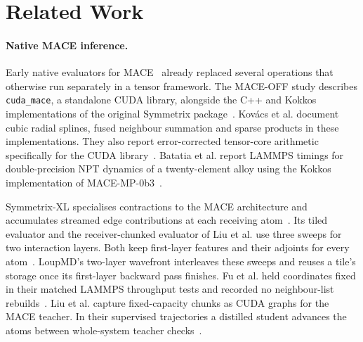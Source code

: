 \section{Related Work}
\label{sec:related}

\paragraph{Native MACE inference.}
Early native evaluators for MACE~\cite{batatia2022mace} already replaced several operations that otherwise run separately in a tensor framework. The MACE-OFF study describes \texttt{cuda\_mace}, a standalone CUDA library, alongside the C++ and Kokkos implementations of the original Symmetrix package~\cite{kovacs2025maceoff,witt2026symmetrix}. Kov\'acs et al. document cubic radial splines, fused neighbour summation and sparse products in these implementations. They also report error-corrected tensor-core arithmetic specifically for the CUDA library~\cite[\S III.5]{kovacs2025maceoff}. Batatia et al. report LAMMPS timings for double-precision NPT dynamics of a twenty-element alloy using the Kokkos implementation of MACE-MP-0b3~\cite[Appendix~A.32, Fig.~S50]{batatia2025materials}.

Symmetrix-XL specialises contractions to the MACE architecture and accumulates streamed edge contributions at each receiving atom~\cite[\S\S 3--4]{fu2026symmetrixxl}. Its tiled evaluator and the receiver-chunked evaluator of Liu et al. use three sweeps for two interaction layers. Both keep first-layer features and their adjoints for every atom~\cite{fu2026symmetrixxl,liu2026foundation}. LoupMD's two-layer wavefront interleaves these sweeps and reuses a tile's storage once its first-layer backward pass finishes. Fu et al. held coordinates fixed in their matched LAMMPS throughput tests and recorded no neighbour-list rebuilds~\cite[\S 6]{fu2026symmetrixxl}. Liu et al. capture fixed-capacity chunks as CUDA graphs for the MACE teacher. In their supervised trajectories a distilled student advances the atoms between whole-system teacher checks~\cite[\S\S 2.1--2.3 and 3.6]{liu2026foundation}.

